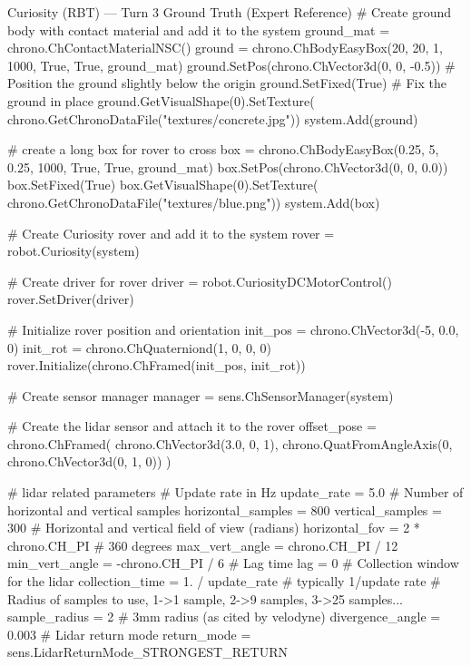 \documentclass{ieeeaccess}
\begin{document}
\begin{appendices}
\begin{CodeBlock}[breakable]{Curiosity (RBT) --- Turn 3 Ground Truth (Expert Reference)}
# Create ground body with contact material and add it to the system
ground_mat = chrono.ChContactMaterialNSC()
ground = chrono.ChBodyEasyBox(20, 20, 1, 1000, True, True, ground_mat)
ground.SetPos(chrono.ChVector3d(0, 0, -0.5))  # Position the ground slightly below the origin
ground.SetFixed(True)  # Fix the ground in place
ground.GetVisualShape(0).SetTexture(
    chrono.GetChronoDataFile("textures/concrete.jpg"))
system.Add(ground)

# create a long box for rover to cross
box = chrono.ChBodyEasyBox(0.25, 5, 0.25, 1000, True, True, ground_mat)
box.SetPos(chrono.ChVector3d(0, 0, 0.0))
box.SetFixed(True)
box.GetVisualShape(0).SetTexture(
    chrono.GetChronoDataFile("textures/blue.png"))
system.Add(box)

# Create Curiosity rover and add it to the system
rover = robot.Curiosity(system)

# Create driver for rover
driver = robot.CuriosityDCMotorControl()
rover.SetDriver(driver)

# Initialize rover position and orientation
init_pos = chrono.ChVector3d(-5, 0.0, 0)
init_rot = chrono.ChQuaterniond(1, 0, 0, 0)
rover.Initialize(chrono.ChFramed(init_pos, init_rot))

# Create sensor manager
manager = sens.ChSensorManager(system)

# Create the lidar sensor and attach it to the rover
offset_pose = chrono.ChFramed(
        chrono.ChVector3d(3.0, 0, 1), chrono.QuatFromAngleAxis(0, chrono.ChVector3d(0, 1, 0))
    )

# lidar related parameters
# Update rate in Hz
update_rate = 5.0
# Number of horizontal and vertical samples
horizontal_samples = 800
vertical_samples = 300
# Horizontal and vertical field of view (radians)
horizontal_fov = 2 * chrono.CH_PI  # 360 degrees
max_vert_angle = chrono.CH_PI / 12
min_vert_angle = -chrono.CH_PI / 6
# Lag time
lag = 0
# Collection window for the lidar
collection_time = 1. / update_rate  # typically 1/update rate
# Radius of samples to use, 1->1 sample, 2->9 samples, 3->25 samples...
sample_radius = 2
# 3mm radius (as cited by velodyne)
divergence_angle = 0.003
# Lidar return mode
return_mode = sens.LidarReturnMode_STRONGEST_RETURN


\end{CodeBlock}
\end{appendices}
\end{document}
